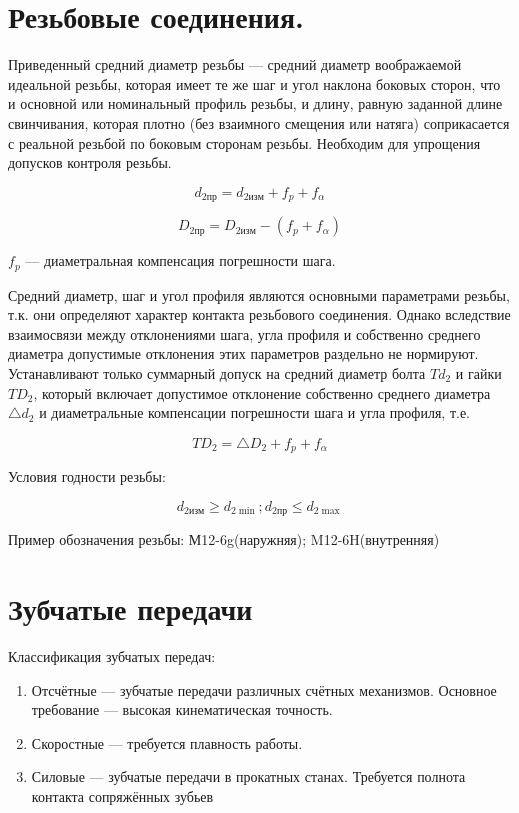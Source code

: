 \section{Резьбовые соединения.}

Приведенный средний диаметр резьбы --- средний диаметр воображаемой идеальной резьбы, которая имеет те же шаг и угол наклона боковых сторон, что и основной или номинальный профиль резьбы, и длину, равную заданной длине свинчивания, которая плотно (без взаимного смещения или натяга) соприкасается с реальной резьбой по боковым сторонам резьбы. Необходим для упрощения допусков контроля резьбы.

\[ d_{2 пр} = d_{2 изм} + f_p + f_{\alpha} \]

\[  D_{2 пр} = D_{2 изм} - (f_p + f_{\alpha})  \]

$f_p$ --- диаметральная компенсация погрешности шага.

Средний диаметр, шаг и угол профиля являются основными параметрами резьбы, т.к. они определяют характер контакта резьбового соединения. Однако вследствие взаимосвязи между отклонениями шага, угла профиля и собственно среднего диаметра допустимые отклонения этих параметров раздельно не нормируют. Устанавливают только суммарный допуск на средний диаметр болта $Td_2$ и гайки $TD_2$, который включает допустимое отклонение собственно среднего диаметра $\bigtriangleup d_2$ и диаметральные компенсации погрешности шага и угла профиля, т.е.

\[ TD_2 = \bigtriangleup D_2 + f_p + f_{\alpha} \]

Условия годности резьбы:

\[ d_{2 изм} \geqslant d_{2 \min}; d_{2 пр} \leqslant d_{2 \max} \]

Пример обозначения резьбы: М12-6g(наружняя); M12-6H(внутренняя)

\section{Зубчатые передачи}

Классификация зубчатых передач:

\begin{enumerate}
	\item Отсчётные --- зубчатые передачи различных счётных механизмов. Основное требование --- высокая кинематическая точность.
	\item Скоростные --- требуется плавность работы.
	\item Силовые --- зубчатые передачи в прокатных станах. Требуется полнота контакта сопряжённых зубьев
\end{enumerate}

